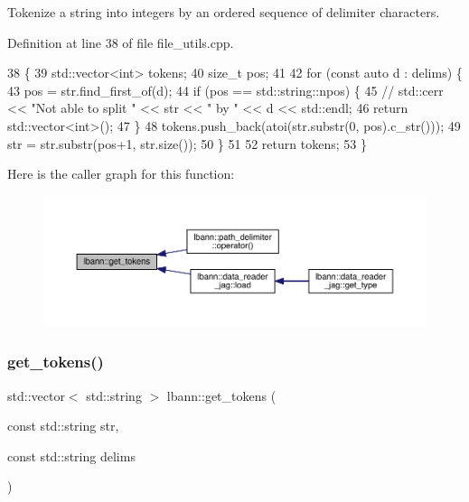 Tokenize a string into integers by an ordered sequence of delimiter characters. 



Definition at line 38 of file file\+\_\+utils.\+cpp.


\begin{DoxyCode}
38                                                                        \{
39   std::vector<int> tokens;
40   \textcolor{keywordtype}{size\_t} pos;
41 
42   \textcolor{keywordflow}{for} (\textcolor{keyword}{const} \textcolor{keyword}{auto} d : delims) \{
43     pos = str.find\_first\_of(d);
44     \textcolor{keywordflow}{if} (pos == std::string::npos) \{
45      \textcolor{comment}{// std::cerr << "Not able to split " << str << " by " << d << std::endl;}
46       \textcolor{keywordflow}{return} std::vector<int>();
47     \}
48     tokens.push\_back(atoi(str.substr(0, pos).c\_str()));
49     str = str.substr(pos+1, str.size());
50   \}
51 
52   \textcolor{keywordflow}{return} tokens;
53 \}
\end{DoxyCode}
Here is the caller graph for this function\+:\nopagebreak
\begin{figure}[H]
\begin{center}
\leavevmode
\includegraphics[width=350pt]{namespacelbann_af3f2c9055423e1fe3380b1ad4c4ab5ef_icgraph}
\end{center}
\end{figure}
\mbox{\label{namespacelbann_ac02a174553cf05f779743be1c92f1912}} 
\subsubsection{\texorpdfstring{get\+\_\+tokens()}{get\_tokens()}\hspace{0.1cm}{\footnotesize\ttfamily [2/2]}}
{\footnotesize\ttfamily std\+::vector$<$ std\+::string $>$ lbann\+::get\+\_\+tokens (\begin{DoxyParamCaption}\item[{const std\+::string}]{str,  }\item[{const std\+::string}]{delims }\end{DoxyParamCaption})}



